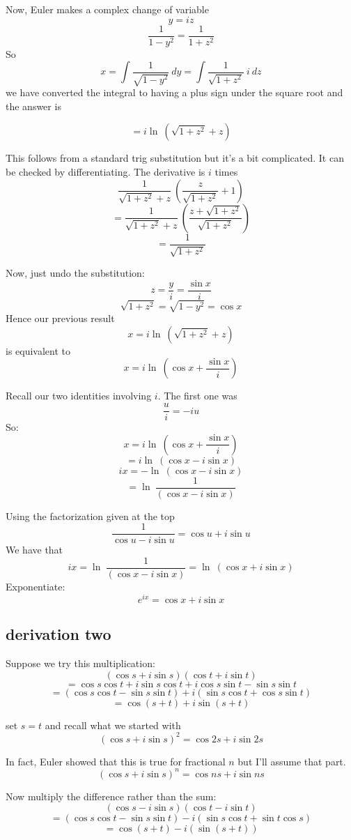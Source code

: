 \documentclass[11pt, oneside]{article}
\begin{document}
Now, Euler makes a complex change of variable
\[ y = iz \]
\[ \frac{1}{1-y^2} = \frac{1}{1+z^2} \]
So
\[ x = \int \frac{1}{\sqrt{1 - y^2}} \ dy = \int \frac{1}{\sqrt{1 + z^2}} \ i \ dz \]
we have converted the integral to having a plus sign under the square root and the answer is

\[ = i \ln \ (\sqrt{{1 + z^2}} + z) \]

This follows from a standard trig substitution but it's a bit complicated.  It can be checked by differentiating.  The derivative is $i$ times
\[ \frac{1}{\sqrt{1 + z^2} + z} \ (\frac{z}{ \sqrt{1+z^2}} + 1) \]
\[ = \frac{1}{\sqrt{1 + z^2} + z} \ (\frac{z + \sqrt{1+z^2}}{ \sqrt{1+z^2}}) \]
\[ = \frac{1}{\sqrt{1 + z^2}}  \]

Now, just undo the substitution:
\[ z = \frac{y}{i} = \frac{ \sin x}{i} \]
\[ \sqrt{1 + z^2} = \sqrt{1 - y^2} = \cos x \]
Hence our previous result
\[ x = i \ln \ (\sqrt{{1 + z^2}} + z) \]
is equivalent to
\[ x = i \ln \ (\cos x + \frac{\sin x}{i}) \]

Recall our two identities involving $i$.  The first one was
\[ \frac{u}{i} = - i u \]
So:
\[ x = i \ln \ (\cos x + \frac{\sin x}{i}) \]
\[ = i \ln \ (\cos x - i \sin x) \]
\[ ix = - \ln \ (\cos x - i \sin x) \]
\[ = \ln \ \frac{1}{(\cos x - i \sin x)} \]

Using the factorization given at the top
\[ \frac{1}{\cos u - i \sin u} = \cos u + i \sin u \]
We have that
\[ ix = \ln \ \frac{1}{(\cos x - i \sin x)}  = \ln \ (\cos x + i \sin x) \]
Exponentiate:
\[ e^{ix} = \cos x + i \sin x \]

\subsection*{derivation two}
Suppose we try this multiplication:
\[ (\cos s + i \sin s) (\cos t + i \sin t) \]
\[ = \cos s \cos t + i \sin s \cos t + i \cos s \sin t - \sin s \sin t \]
\[ = (\cos s \cos t - \sin s \sin t) + i (\sin s \cos t + \cos s \sin t) \]
\[ = \cos (s+t) + i \sin(s + t) \]

set $s=t$ and recall what we started with
\[ (\cos s + i \sin s)^2 = \cos 2s + i \sin 2s \]

In fact, Euler showed that this is true for fractional $n$ but I'll assume that part.
\[ (\cos s + i \sin s)^n = \cos ns  + i \sin ns \]

Now multiply the difference rather than the sum:
\[ (\cos s - i \sin s) (\cos t - i \sin t) \]
\[ = (\cos s \cos t - \sin s \sin t ) - i (\sin s \cos t + \sin t \cos s) \]
\[ = \cos(s+t) - i (\sin (s + t)) \]
\end{document}
